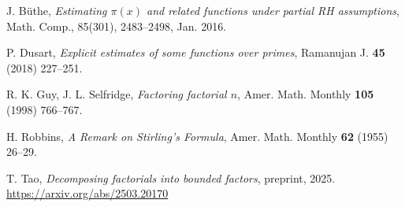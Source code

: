 \documentclass[12pt,a4paper,reqno]{amsart}
\numberwithin{equation}{section}
\theoremstyle{plain}
\theoremstyle{definition}
\begin{document}
\begin{thebibliography}{10}

J. B\"uthe, \emph{Estimating $\pi(x)$ and related functions under partial RH assumptions}, Math. Comp., 85(301), 2483--2498, Jan. 2016.

P. Dusart, \emph{Explicit estimates of some functions over primes}, Ramanujan J. \textbf{45} (2018) 227--251.

R. K. Guy, J. L. Selfridge, \emph{Factoring factorial $n$}, Amer. Math. Monthly \textbf{105} (1998) 766--767.

H. Robbins, \emph{A Remark on Stirling's Formula}, Amer. Math. Monthly \textbf{62} (1955) 26--29.

T. Tao, \emph{Decomposing factorials into bounded factors}, preprint, 2025. \url{https://arxiv.org/abs/2503.20170}

\end{thebibliography}
\end{document}
